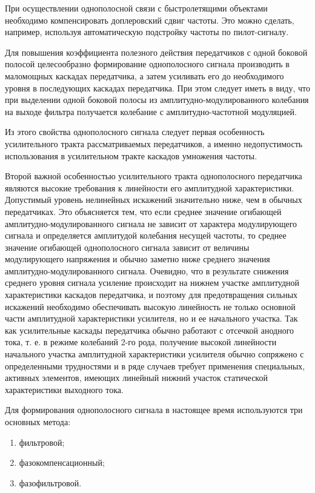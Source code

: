 При осуществлении однополосной связи с быстролетящими объектами необходимо компенсировать доплеровский сдвиг частоты. Это можно сделать, например, используя автоматическую подстройку частоты по пилот-сигналу.

Для повышения коэффициента полезного действия передатчиков с одной боковой полосой целесообразно формирование однополосного сигнала производить в маломощных каскадах передатчика, а затем усиливать его до необходимого уровня в последующих каскадах передатчика. При этом следует иметь в виду, что при выделении одной боковой полосы из амплитудно-модулированного колебания на выходе фильтра получается колебание с
амплитудно-частотной модуляцией.

Из этого свойства однополосного сигнала следует первая особенность усилительного тракта рассматриваемых передатчиков, а именно недопустимость использования в усилительном тракте каскадов умножения частоты.

Второй важной особенностью усилительного тракта однополосного передатчика являются высокие требования к линейности его амплитудной характеристики. Допустимый уровень нелинейных искажений значительно ниже, чем в обычных передатчиках. Это объясняется тем, что если среднее значение огибающей амплитудно-модулированного сигнала не зависит от характера модулирующего сигнала и определяется амплитудой колебания несущей частоты, то среднее значение огибающей однополосного сигнала зависит от величины модулирующего напряжения и обычно заметно ниже среднего значения амплитудно-модулированного сигнала. Очевидно, что в результате снижения среднего уровня сигнала усиление происходит на нижнем
участке амплитудной характеристики каскадов передатчика, и поэтому для предотвращения сильных искажений необходимо обеспечивать высокую линейность не только основной части амплитудной характеристики усилителя, но и ее начального участка. Так как усилительные каскады передатчика обычно работают с отсечкой анодного тока, т. е. в режиме колебаний 2-го рода, получение высокой линейности начального участка амплитудной характеристики усилителя обычно сопряжено с определенными трудностями и в ряде случаев требует применения специальных, активных элементов, имеющих линейный нижний участок статической характеристики выходного тока. 

Для формирования однополосного сигнала в настоящее время
используются три основных метода: 
\begin{enumerate}
	\item фильтровой;
	\item фазокомпенсационный;
	\item фазофильтровой.
\end{enumerate} 

